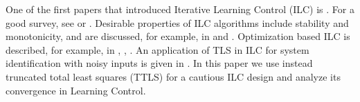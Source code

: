 One of the first papers that introduced Iterative Learning Control (ILC) is \cite{Arimoto84}. For a good survey, see \cite{Bristow06} or \cite{Moore07}. Desirable properties of ILC algorithms include stability and monotonicity, and are discussed, for example, in \cite{Norrloef02} and \cite{Bristow06}. Optimization based ILC is described, for example, in \cite{Amann95}, \cite{Bristow06}, \cite{Moore07}. An application of TLS in ILC for system identification with noisy inputs is given in \cite{ZhangBo14}. In this paper we use instead truncated total least squares (TTLS) for a cautious ILC design and analyze its convergence in Learning Control. %

